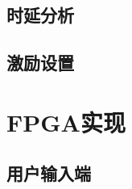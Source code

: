 \documentclass[lang=cn,a4paper,newtx]{elegantpaper}
\begin{document}
\subsection{时延分析}

\subsection{激励设置}

\section{FPGA实现}
\subsection{用户输入端}


\nocite{FPGA-CPU}
\newpage
\printbibliography
\newpage
\addappheadtotoc
\end{document}
